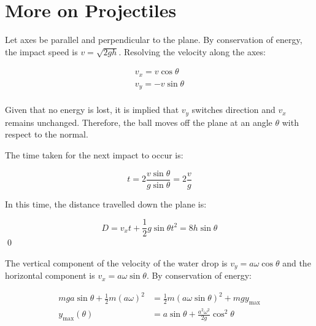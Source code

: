 \documentclass[12pt]{article}
\begin{document}



\pagebreak
\section*{More on Projectiles}


Let axes be parallel and perpendicular to the plane. By conservation of energy, the impact speed is $v = \sqrt{2gh}$. Resolving the velocity along the axes:

\begin{equation}
\begin{split}
    v_{x} = v \cos{\theta} \\
    v_{y} = -v \sin{\theta} \\
\end{split}
\end{equation}

Given that no energy is lost, it is implied that $v_{y}$ switches direction and $v_{x}$ remains unchanged. Therefore, the ball moves off the plane at an angle $\theta$ with respect to the normal.

The time taken for the next impact to occur is:

\begin{equation}
    t = 2 \frac{v \sin{\theta}}{g \sin{\theta}} = 2 \frac{v}{g}
\end{equation}

In this time, the distance travelled down the plane is:

\begin{equation}
    D = v_{x} t + \frac{1}{2} g \sin{\theta} t^{2} = 8h\sin{\theta}
\end{equation}
\qed



The vertical component of the velocity of the water drop is $v_{y} = a\omega \cos{\theta}$ and the horizontal component is $v_{x} = a\omega \sin{\theta}$. By conservation of energy:

\begin{equation}
\begin{split}
    mga \sin{\theta} + \frac{1}{2} m (a\omega)^{2} &= \frac{1}{2} m (a\omega \sin{\theta})^{2} + mg y_{\text{max}} \\
    y_{\text{max}}(\theta) &= a \sin{\theta} + \frac{a^{2}\omega^{2}}{2g} \cos^{2}{\theta}
\end{split}
\end{equation}
\end{document}
